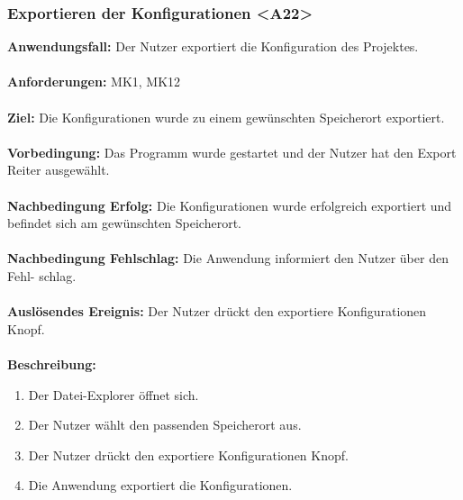 \documentclass[parskip=full]{scrartcl} %
\begin{document}
\subsubsection*{Exportieren der Konfigurationen <A22>}
\textbf{Anwendungsfall:} Der Nutzer exportiert die Konfiguration des Projektes.\\\\
\textbf{Anforderungen:} MK1, MK12\\\\
\textbf{Ziel:} Die Konfigurationen wurde zu einem gewünschten Speicherort exportiert.\\\\
\textbf{Vorbedingung:} Das Programm wurde gestartet und der Nutzer hat den Export Reiter ausgewählt.\\\\
\textbf{Nachbedingung Erfolg:} Die Konfigurationen wurde erfolgreich exportiert und befindet sich am gewünschten Speicherort.\\\\
\textbf{Nachbedingung Fehlschlag:}  Die Anwendung informiert den Nutzer über den Fehl-  
schlag.\\\\
\textbf{Auslösendes Ereignis:} Der Nutzer drückt den exportiere Konfigurationen Knopf. \\\\
\textbf{Beschreibung:}
\begin{enumerate}
    \item Der Datei-Explorer öffnet sich.
    \item Der Nutzer wählt den passenden Speicherort aus.
    \item Der Nutzer drückt den exportiere Konfigurationen Knopf.
    \item Die Anwendung exportiert die Konfigurationen.
\end{enumerate}
\newpage
\end{document}
